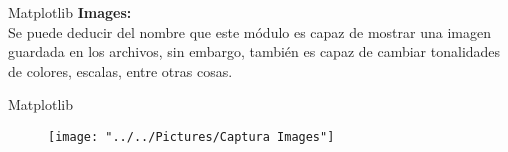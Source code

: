 \documentclass{beamer}
\begin{document}
\begin{frame}{Matplotlib}
	\textbf{Images:}\\ Se puede deducir del nombre que este módulo es capaz de mostrar una imagen guardada en los archivos, sin embargo, también es capaz de cambiar tonalidades de colores, escalas, entre otras cosas.
\end{frame}

\begin{frame}{Matplotlib}
	\begin{figure}
	\centering
	\texttt{[image: "../../Pictures/Captura Images"]}
	\caption{}
	\label{fig:captura-images}
\end{figure}

\end{frame}
\end{document}
